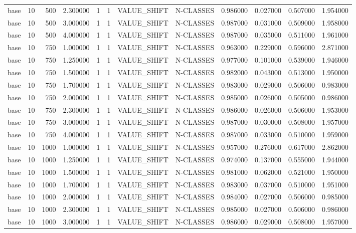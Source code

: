 \begin{tabular}{lrrrllllrrrr}
base & 10 & 500 & 2.300000 & 1 & 1 & VALUE_SHIFT & N-CLASSES & 0.986000 & 0.027000 & 0.507000 & 1.954000 \\
base & 10 & 500 & 3.000000 & 1 & 1 & VALUE_SHIFT & N-CLASSES & 0.987000 & 0.031000 & 0.509000 & 1.958000 \\
base & 10 & 500 & 4.000000 & 1 & 1 & VALUE_SHIFT & N-CLASSES & 0.987000 & 0.035000 & 0.511000 & 1.961000 \\
base & 10 & 750 & 1.000000 & 1 & 1 & VALUE_SHIFT & N-CLASSES & 0.963000 & 0.229000 & 0.596000 & 2.871000 \\
base & 10 & 750 & 1.250000 & 1 & 1 & VALUE_SHIFT & N-CLASSES & 0.977000 & 0.101000 & 0.539000 & 1.946000 \\
base & 10 & 750 & 1.500000 & 1 & 1 & VALUE_SHIFT & N-CLASSES & 0.982000 & 0.043000 & 0.513000 & 1.950000 \\
base & 10 & 750 & 1.700000 & 1 & 1 & VALUE_SHIFT & N-CLASSES & 0.983000 & 0.029000 & 0.506000 & 0.983000 \\
base & 10 & 750 & 2.000000 & 1 & 1 & VALUE_SHIFT & N-CLASSES & 0.985000 & 0.026000 & 0.505000 & 0.986000 \\
base & 10 & 750 & 2.300000 & 1 & 1 & VALUE_SHIFT & N-CLASSES & 0.986000 & 0.026000 & 0.506000 & 1.953000 \\
base & 10 & 750 & 3.000000 & 1 & 1 & VALUE_SHIFT & N-CLASSES & 0.987000 & 0.030000 & 0.508000 & 1.957000 \\
base & 10 & 750 & 4.000000 & 1 & 1 & VALUE_SHIFT & N-CLASSES & 0.987000 & 0.033000 & 0.510000 & 1.959000 \\
base & 10 & 1000 & 1.000000 & 1 & 1 & VALUE_SHIFT & N-CLASSES & 0.957000 & 0.276000 & 0.617000 & 2.862000 \\
base & 10 & 1000 & 1.250000 & 1 & 1 & VALUE_SHIFT & N-CLASSES & 0.974000 & 0.137000 & 0.555000 & 1.944000 \\
base & 10 & 1000 & 1.500000 & 1 & 1 & VALUE_SHIFT & N-CLASSES & 0.981000 & 0.062000 & 0.521000 & 1.950000 \\
base & 10 & 1000 & 1.700000 & 1 & 1 & VALUE_SHIFT & N-CLASSES & 0.983000 & 0.037000 & 0.510000 & 1.951000 \\
base & 10 & 1000 & 2.000000 & 1 & 1 & VALUE_SHIFT & N-CLASSES & 0.984000 & 0.027000 & 0.506000 & 0.985000 \\
base & 10 & 1000 & 2.300000 & 1 & 1 & VALUE_SHIFT & N-CLASSES & 0.985000 & 0.027000 & 0.506000 & 0.986000 \\
base & 10 & 1000 & 3.000000 & 1 & 1 & VALUE_SHIFT & N-CLASSES & 0.986000 & 0.029000 & 0.508000 & 1.957000 \\

\end{tabular}
